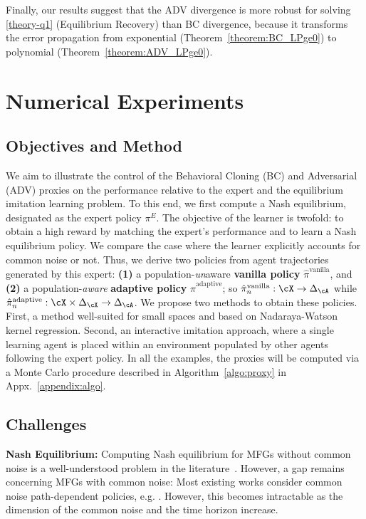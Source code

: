 \documentclass{article}
\newcommand{\defi}[1]{{\bf #1}}
\theoremstyle{plain}
\begin{document}
Finally, our results suggest that the ADV divergence is more robust for solving \ref{theory-q1} (Equilibrium Recovery) than BC divergence, because it transforms the error propagation from exponential (Theorem~\ref{theorem:BC_LPge0}) to polynomial (Theorem~\ref{theorem:ADV_LPge0}).




\section{Numerical Experiments}
\label{sec:numerics}

\subsection{Objectives and Method}
We aim to illustrate the control of the Behavioral Cloning (BC) and Adversarial (ADV) proxies on the performance relative to the expert and the equilibrium imitation learning problem. To this end, we first compute a Nash equilibrium, designated as the expert policy $\pi^E$. 
The objective of the learner is twofold: to obtain a high reward by matching the expert's performance and to learn a Nash equilibrium policy. We compare the case where the learner explicitly accounts for common noise or not.
Thus, we derive two policies from agent trajectories generated by this expert: {\bf (1)}
a population-\textit{un}aware \defi{vanilla policy} $\hat{\pi}^{\text{vanilla}}$, and {\bf (2)} a population-\textit{aware} \defi{adaptive policy} $\hat{\pi}^{\text{adaptive}}$; so $\hat{\pi}^{\text{vanilla}}_n:\cX \to \Delta_{\cA}$ while $\hat{\pi}^{\text{adaptive}}_n: \cX \times \Delta_{\cX} \to \Delta_{\cA}$. We propose two methods to obtain these policies. First, a method well-suited for small spaces and based on Nadaraya-Watson kernel regression. Second, an interactive imitation approach, where a single learning agent is placed within an environment populated by other agents following the expert policy. In all the examples, the proxies will be computed via a Monte Carlo procedure described in Algorithm~\ref{algo:proxy} in Appx.~\ref{appendix:algo}.



\subsection{Challenges}

\noindent\textbf{Nash Equilibrium:}
Computing Nash equilibrium for MFGs without common noise is a well-understood problem in the literature~\cite{achdou2020mean}. However, a gap remains concerning MFGs with common noise: Most existing works consider common noise path-dependent policies, e.g. \cite{achdou2018mean,perrin_master_2022}. However, this becomes intractable as the dimension of the common noise and the time horizon increase.
\end{document}
